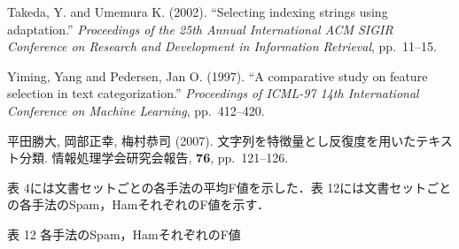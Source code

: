 \documentclass[japanese]{jnlp_1.4}
\begin{document}
\begin{thebibliography}{}
\item
Takeda, Y. and Umemura K. (2002). ``Selecting indexing strings using 
adaptation.'' \textit{Proceedings of the 25th Annual International ACM SIGIR 
Conference on Research and Development in Information Retrieval}, pp.~11--15.

\item
Yiming, Yang and Pedersen, Jan O. (1997). ``A comparative study on feature 
selection in text categorization.'' \textit{Proceedings of ICML-97 14th 
International Conference on Machine Learning}, pp.~412--420.

\item
平田勝大, 岡部正幸, 梅村恭司 (2007). 文字列を特徴量とし反復度を用いたテキスト分類. 
情報処理学会研究会報告, \textbf{76}, pp.~121--126.

\end{thebibliography}


\clearpage

\appendix

表 4には文書セットごとの各手法の平均F値を示した．表 12には文書セットごとの各手法のSpam，HamそれぞれのF値を示す．

\begin{table}[h]
\caption{表 12 各手法のSpam，HamそれぞれのF値}

\end{table}


\begin{biography}

\end{biography}









\biodate
\end{document}
